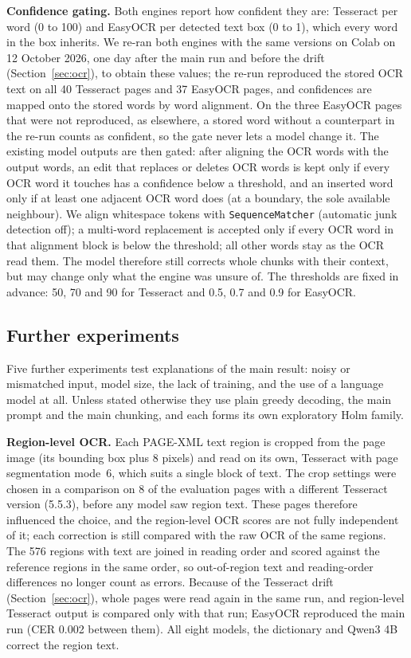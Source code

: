 \documentclass[conference]{IEEEtran}
\begin{document}
\textbf{Confidence gating.} Both engines report how confident they are: Tesseract per word (0 to 100) and EasyOCR per detected text box (0 to 1), which every word in the box inherits. We re-ran both engines with the same versions on Colab on 12 October 2026, one day after the main run and before the drift (Section~\ref{sec:ocr}), to obtain these values; the re-run reproduced the stored OCR text on all 40 Tesseract pages and 37 EasyOCR pages, and confidences are mapped onto the stored words by word alignment. On the three EasyOCR pages that were not reproduced, as elsewhere, a stored word without a counterpart in the re-run counts as confident, so the gate never lets a model change it. The existing model outputs are then gated: after aligning the OCR words with the output words, an edit that replaces or deletes OCR words is kept only if every OCR word it touches has a confidence below a threshold, and an inserted word only if at least one adjacent OCR word does (at a boundary, the sole available neighbour). We align whitespace tokens with \texttt{SequenceMatcher} (automatic junk detection off); a multi-word replacement is accepted only if every OCR word in that alignment block is below the threshold; all other words stay as the OCR read them. The model therefore still corrects whole chunks with their context, but may change only what the engine was unsure of. The thresholds are fixed in advance: 50, 70 and 90 for Tesseract and 0.5, 0.7 and 0.9 for EasyOCR.

\subsection{Further experiments}
\label{sec:further}
Five further experiments test explanations of the main result: noisy or mismatched input, model size, the lack of training, and the use of a language model at all. Unless stated otherwise they use plain greedy decoding, the main prompt and the main chunking, and each forms its own exploratory Holm family.

\textbf{Region-level OCR.} Each PAGE-XML text region is cropped from the page image (its bounding box plus 8 pixels) and read on its own, Tesseract with page segmentation mode~6, which suits a single block of text. The crop settings were chosen in a comparison on 8 of the evaluation pages with a different Tesseract version (5.5.3), before any model saw region text. These pages therefore influenced the choice, and the region-level OCR scores are not fully independent of it; each correction is still compared with the raw OCR of the same regions. The 576 regions with text are joined in reading order and scored against the reference regions in the same order, so out-of-region text and reading-order differences no longer count as errors. Because of the Tesseract drift (Section~\ref{sec:ocr}), whole pages were read again in the same run, and region-level Tesseract output is compared only with that run; EasyOCR reproduced the main run (CER 0.002 between them). All eight models, the dictionary and Qwen3 4B correct the region text.
\end{document}
